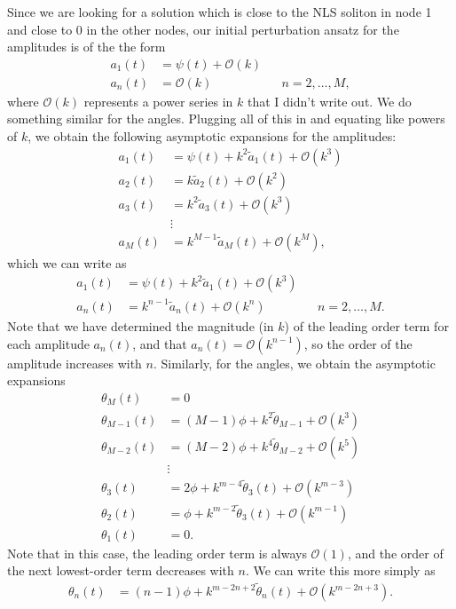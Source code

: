 \documentclass[11pt,reqno]{amsart}
\begin{document}
Since we are looking for a solution which is close to the NLS soliton in node 1 and close to 0 in the other nodes, our initial perturbation ansatz for the amplitudes is of the the form
\begin{align*}
a_1(t) &= \psi(t) + \mathcal{O}(k) \\
a_n(t) &= \mathcal{O}(k) && n = 2, \dots, M,
\end{align*}
where $\mathcal{O}(k)$ represents a power series in $k$ that I didn't write out. We do something similar for the angles. Plugging all of this in and equating like powers of $k$, we obtain the following asymptotic expansions for the amplitudes:
\begin{align*}
a_1(t) &= \psi(t) + k^2 \tilde{a}_1(t) + \mathcal{O}(k^3) \\
a_2(t) &= k \tilde{a}_2(t) + \mathcal{O}(k^2) \\
a_3(t) &= k^2 \tilde{a}_3(t) + \mathcal{O}(k^3) \\
&\vdots \\
a_M(t) &= k^{M-1} \tilde{a}_M(t) + \mathcal{O}(k^M),
\end{align*}
which we can write as
\begin{align*}
a_1(t) &= \psi(t) + k^2 \tilde{a}_1(t) + \mathcal{O}(k^3) \\
a_n(t) &= k^{n-1} \tilde{a}_n(t) + \mathcal{O}(k^n) && n = 2, \dots, M.
\end{align*}
Note that we have determined the magnitude (in $k$) of the leading order term for each amplitude $a_n(t)$, and that $a_n(t) = \mathcal{O}(k^{n-1})$, so the order of the amplitude increases with $n$. Similarly, for the angles, we obtain the asymptotic expansions
\begin{align*}
\theta_M(t) &= 0 \\
\theta_{M-1}(t) &= (M-1)\phi + k^2 \tilde{\theta}_{M-1} + \mathcal{O}(k^3) \\
\theta_{M-2}(t) &= (M-2)\phi + k^4 \tilde{\theta}_{M-2} + \mathcal{O}(k^5) \\
&\vdots \\
\theta_3(t) &= 2 \phi + k^{m-4} \tilde{\theta}_3(t) + \mathcal{O}(k^{m-3}) \\
\theta_2(t) &= \phi + k^{m-2} \tilde{\theta}_3(t) + \mathcal{O}(k^{m-1}) \\
\theta_1(t) &= 0.
\end{align*}
Note that in this case, the leading order term is always $\mathcal{O}(1)$, and the order of the next lowest-order term decreases with $n$. We can write this more simply as
\begin{align*}
\theta_n(t) &= (n-1)\phi + k^{m-2n+2}\tilde{\theta}_n(t) + \mathcal{O}(k^{m-2n+3}).
\end{align*}
\end{document}
